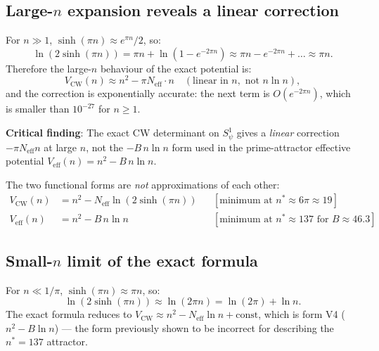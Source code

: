 \documentclass[12pt,a4paper]{article}
\theoremstyle{definition}
\theoremstyle{remark}
\begin{document}
\subsection{Large-$n$ expansion reveals a linear correction}

For $n \gg 1$, $\sinh(\pi n) \approx e^{\pi n}/2$, so:
\begin{equation}
  \ln(2\sinh(\pi n))
  = \pi n + \ln(1 - e^{-2\pi n})
  \approx \pi n - e^{-2\pi n} + \ldots \approx \pi n.
  \label{eq:cw:largn_ln}
\end{equation}
Therefore the large-$n$ behaviour of the exact potential is:
\begin{equation}
  V_{\mathrm{CW}}(n) \approx n^2 - \pi N_{\mathrm{eff}} \cdot n
  \quad (\text{linear in } n, \text{ not } n\ln n),
  \label{eq:cw:largn_linear}
\end{equation}
and the correction is exponentially accurate: the next term is
$O(e^{-2\pi n})$, which is smaller than $10^{-27}$ for $n \ge 1$.

\begin{warnbox}
\textbf{Critical finding}: The exact CW determinant on $S^1_\psi$ gives
a \emph{linear} correction $-\pi N_{\mathrm{eff}} n$ at large $n$, not the
$-B\,n\ln n$ form used in the prime-attractor effective potential
$V_{\mathrm{eff}}(n) = n^2 - B\,n\ln n$.

The two functional forms are \emph{not} approximations of each other:
\begin{align*}
  V_{\mathrm{CW}}(n) &= n^2 - N_{\mathrm{eff}}\ln(2\sinh(\pi n))
    &&[\text{minimum at } n^* \approx 6\pi \approx 19] \\
  V_{\mathrm{eff}}(n) &= n^2 - B\,n\ln n
    &&[\text{minimum at } n^* \approx 137 \text{ for } B \approx 46.3]
\end{align*}
\end{warnbox}

\subsection{Small-$n$ limit of the exact formula}

For $n \ll 1/\pi$, $\sinh(\pi n) \approx \pi n$, so:
\begin{equation}
  \ln(2\sinh(\pi n)) \approx \ln(2\pi n) = \ln(2\pi) + \ln n.
  \label{eq:cw:smalln}
\end{equation}
The exact formula reduces to
$V_{\mathrm{CW}} \approx n^2 - N_{\mathrm{eff}}\ln n + \text{const}$,
which is form V4 ($n^2 - B\ln n$) — the form previously shown to be incorrect
for describing the $n^* = 137$ attractor.
\end{document}
